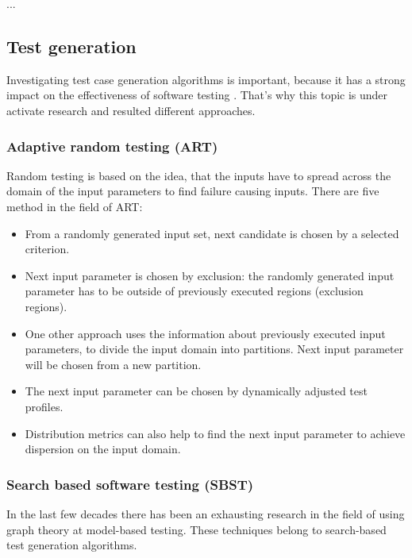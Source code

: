 ...


\subsection{Test generation}
\label{sub:testgeneration}

Investigating test case generation algorithms is important, because it has a strong impact on the effectiveness of software testing \cite{testcasegen} \cite{mbttestcasegeneration}. That's why this topic is under activate research and resulted different approaches.

\subsubsection{Adaptive random testing (ART)}
\label{ssub:randomtesting}

Random testing is based on the idea, that the inputs have to spread across the domain of the input parameters to find failure causing inputs. There are five method in the field of ART:

\begin{itemize}
	\item From a randomly generated input set, next candidate is chosen by a selected criterion.
	\item Next input parameter is chosen by exclusion: the randomly generated input parameter has to be outside of previously executed regions (exclusion regions).
	\item One other approach uses the information about previously executed input parameters, to divide the input domain into partitions. Next input parameter will be chosen from a new partition.
	\item The next input parameter can be chosen by dynamically adjusted test profiles.
	\item Distribution metrics can also help to find the next input parameter to achieve dispersion on the input domain.
\end{itemize}


\subsubsection{Search based software testing (SBST)}
\label{ssub:searchbasedtestgen}

In the last few decades there has been an exhausting research in the field of using graph theory at model-based testing. These techniques belong to search-based test generation algorithms.

